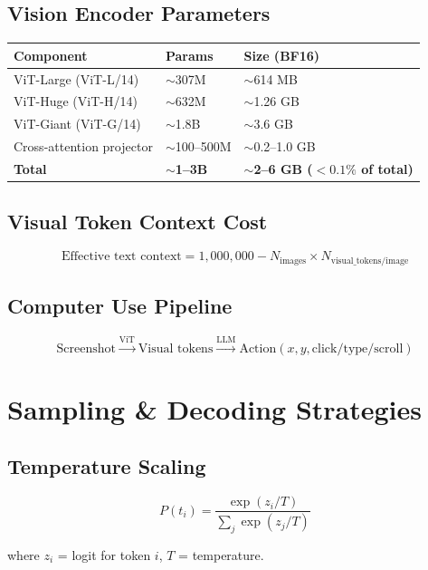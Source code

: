\documentclass[11pt,a4paper]{article}
\begin{document}
\subsection{Vision Encoder Parameters}

\begin{center}
\begin{tabular}{lll}
\toprule
\textbf{Component} & \textbf{Params} & \textbf{Size (BF16)} \\
\midrule
ViT-Large (ViT-L/14) & $\sim$307M & $\sim$614 MB \\
ViT-Huge (ViT-H/14) & $\sim$632M & $\sim$1.26 GB \\
ViT-Giant (ViT-G/14) & $\sim$1.8B & $\sim$3.6 GB \\
Cross-attention projector & $\sim$100--500M & $\sim$0.2--1.0 GB \\
\textbf{Total} & $\sim$\textbf{1--3B} & $\sim$\textbf{2--6 GB ($< 0.1\%$ of total)} \\
\bottomrule
\end{tabular}
\end{center}

\subsection{Visual Token Context Cost}

$$\text{Effective text context} = 1{,}000{,}000 - N_{\text{images}} \times N_{\text{visual\_tokens/image}}$$

\subsection{Computer Use Pipeline}

$$\text{Screenshot} \xrightarrow{\text{ViT}} \text{Visual tokens} \xrightarrow{\text{LLM}} \text{Action}(x, y, \text{click/type/scroll})$$

\section{Sampling \& Decoding Strategies}

\subsection{Temperature Scaling}

$$P(t_i) = \frac{\exp(z_i / T)}{\sum_j \exp(z_j / T)}$$

where $z_i$ = logit for token $i$, $T$ = temperature.
\end{document}
